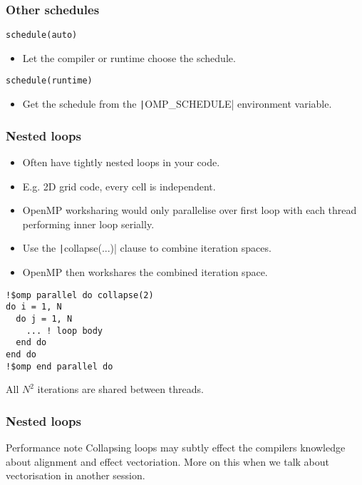 \documentclass{beamer}
\begin{document}
\begin{frame}[fragile]
\frametitle{Other schedules}
\begin{verbatim}
schedule(auto)
\end{verbatim}
\begin{itemize}
  \item Let the compiler or runtime choose the schedule.
\end{itemize}

\vfill

\begin{verbatim}
schedule(runtime)
\end{verbatim}
\begin{itemize}
  \item Get the schedule from the \texttt|OMP_SCHEDULE| environment variable.
\end{itemize}

\end{frame}

\begin{frame}[fragile]
\frametitle{Nested loops}
\begin{itemize}
  \item Often have tightly nested loops in your code.
  \item E.g. 2D grid code, every cell is independent.
  \item OpenMP worksharing would only parallelise over first loop with each thread performing inner loop serially.
  \item Use the \texttt|collapse(...)| clause to combine iteration spaces.
  \item OpenMP then workshares the combined iteration space.
\end{itemize}

\begin{verbatim}
!$omp parallel do collapse(2)
do i = 1, N
  do j = 1, N
    ... ! loop body
  end do
end do
!$omp end parallel do
\end{verbatim}
All $N^2$ iterations are shared between threads.

\end{frame}


\begin{frame}
\frametitle{Nested loops}
\begin{block}{Performance note}
Collapsing loops may subtly effect the compilers knowledge about alignment and effect vectoriation.
More on this when we talk about vectorisation in another session.
\end{block}

\end{frame}
\end{document}
